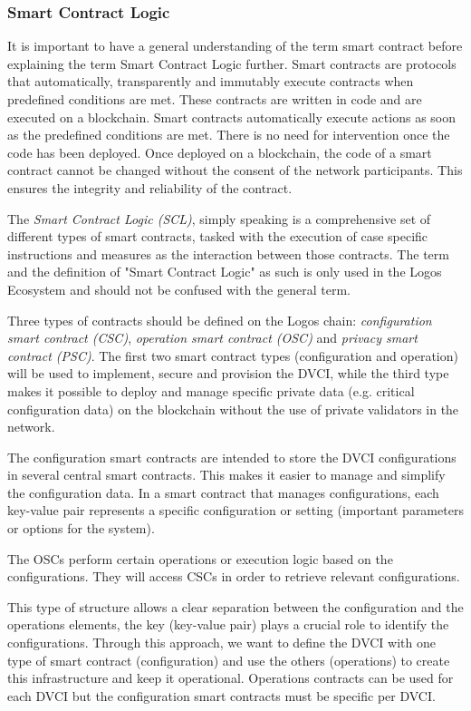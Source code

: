 \documentclass[]{article}
\begin{document}
\subsubsection{Smart Contract Logic}
It is important to have a general understanding of the term smart contract \cite{SubstrateDoc-sc} before explaining the term Smart Contract Logic further.
Smart contracts are protocols that automatically, transparently and immutably execute contracts when predefined conditions are met. 
These contracts are written in code and are executed on a blockchain.
Smart contracts automatically execute actions as soon as the predefined conditions are met. 
There is no need for intervention once the code has been deployed.
Once deployed on a blockchain, the code of a smart contract cannot be changed without the consent of the network participants. 
This ensures the integrity and reliability of the contract.

The \textit{Smart Contract Logic (SCL)}, simply speaking is a comprehensive set of different types of smart contracts, tasked with the execution of case specific instructions and measures as the interaction between those contracts.
The term and the definition of "Smart Contract Logic" as such is only used in the Logos Ecosystem and should not be confused with the general term.

Three types of contracts should be defined on the Logos chain:
\textit{configuration smart contract (CSC)}, \textit{operation smart contract (OSC)} and \textit{privacy smart contract (PSC)}. 
The first two smart contract types (configuration and operation) will be used to implement, secure and provision the DVCI, while the third type makes it possible to deploy and manage specific private data (e.g. critical configuration data) on the blockchain without the use of private validators in the network.  

The configuration smart contracts are intended to store the DVCI configurations in several central smart contracts. 
This makes it easier to manage and simplify the configuration data.
In a smart contract that manages configurations, each key-value pair represents a specific configuration or setting (important parameters or options for the system).

The OSCs perform certain operations or execution logic based on the configurations.
They will access CSCs in order to retrieve relevant configurations.

This type of structure allows a clear separation between the configuration and the operations elements, the key (key-value pair) plays a crucial role to identify the configurations.
Through this approach, we want to define the DVCI with one type of smart contract (configuration) and use the others (operations) to create this infrastructure and keep it operational.
Operations contracts can be used for each DVCI but the configuration smart contracts must be specific per DVCI.
\end{document}
